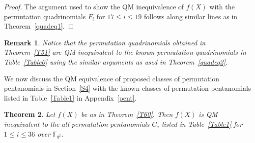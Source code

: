 \documentclass[12pt]{amsart}
\newtheorem{thm}{Theorem}[section]
\newtheorem{rmk}[thm]{Remark}
\numberwithin{equation}{section}
\theoremstyle{definition}
\newcommand{\F}{\mathbb F}
\begin{document}
\begin{proof}
The argument used to show the QM inequivalence of \( f(X) \) with the permutation quadrinomials $F_i$ for $17 \leq i \leq 19$ follows along similar lines as in Theorem~\ref{quadeq1}.
\end{proof}

\begin{rmk}
 Notice that the permutation quadrinomials obtained in Theorem~\ref{T51} are  QM inequivalent to the known permutation quadrinomials in Table~\ref{Table0} using the similar arguments as used in Theorem~\ref{quadeq2}.
\end{rmk}

We now discuss the QM equivalence of proposed classes of permutation pentanomials in Section~\ref{S4} with the known classes of permutation pentanomials listed in Table~\ref{Table1} in Appendix~\ref{pent}.
\begin{thm}\label{penteq1}
 Let $f(X)$ be as in Theorem~\ref{T60}. Then $f(X)$ is QM inequivalent to the all permutation pentanomials $G_i$ listed in Table~\ref{Table1} for $1 \leq i \leq 36$ over $\F_{q^2}$. 
\end{thm}
\end{document}
